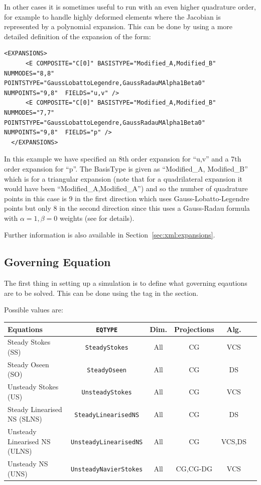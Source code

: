In other cases it is sometimes useful to run with an even higher
quadrature order, for example to handle highly deformed elements where
the Jacobian is represented by a polynomial expansion. This can be done
by using a more detailed definition of the expansion of the form:


\begin{lstlisting}[style=XMLStyle]
  <EXPANSIONS>
      <E COMPOSITE="C[0]" BASISTYPE="Modified_A,Modified_B" NUMMODES="8,8" POINTSTYPE="GaussLobattoLegendre,GaussRadauMAlpha1Beta0" NUMPOINTS="9,8"  FIELDS="u,v" />
      <E COMPOSITE="C[0]" BASISTYPE="Modified_A,Modified_B" NUMMODES="7,7" POINTSTYPE="GaussLobattoLegendre,GaussRadauMAlpha1Beta0" NUMPOINTS="9,8"  FIELDS="p" />
  </EXPANSIONS>
\end{lstlisting}

In this example we have specified an 8th order expansion for ``u,v''
and a 7th order expansion for ``p''. The BasisType is given as
``Modified\_A, Modified\_B'' which is for a triangular expansion (note that for
a quadrilateral expansion it would have been ``Modified\_A,Modified\_A'')
and so the number of quadrature points in this case is 9 in the first
direction which uses Gauss-Lobatto-Legendre points but only 8 in the
second direction since this uses a Gauss-Radau formula with
$\alpha=1,\beta=0$ weights (see \cite{KaSh05} for details).

Further information is also available in Section~\ref{sec:xml:expansions}.

\subsection{Governing Equation}
\label{incns:governingEq}
The first thing in setting up a simulation is to define what governing eqautions
are to be solved. This can be done using the  tag in the
 section.      

Possible values are:
\begin{center}
\footnotesize
\renewcommand\arraystretch{1.2}
\begin{tabular}{lccccc}
\toprule
{Equations} & {\texttt{EQTYPE}} &{Dim.}&{Projections} & Alg.\\
\midrule
Steady Stokes (SS)& \texttt{SteadyStokes} & All & CG &VCS \\
Steady Oseen (SO) & \texttt{SteadyOseen} & All & CG& DS \\
Unsteady Stokes (US) & \texttt{UnsteadyStokes} & All & CG &VCS \\
Steady Linearised NS (SLNS) & \texttt{SteadyLinearisedNS} & All & CG & DS \\
Unsteady Linearised NS (ULNS) & \texttt{UnsteadyLinearisedNS} & All & CG & VCS,DS \\
Unsteady NS (UNS) & \texttt{UnsteadyNavierStokes} & All & CG,CG-DG & VCS\\
\bottomrule
\end{tabular}
\end{center}

